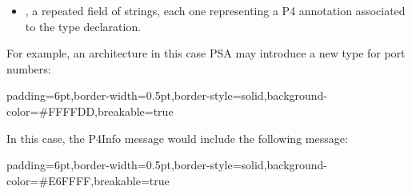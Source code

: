 \documentclass[11pt]{article}
\begin{document}
{\begin{itemize}
\item{}
, a repeated field of strings, each one representing a P4
annotation associated to the type declaration.%
\end{itemize}%

\noindent{}For example, an architecture \textemdash{} in this case PSA \textemdash{} may introduce a new type
for port numbers:%

\begin{mdbmargintb}{6pt}{6pt}%
\begin{mdblock}{padding=6pt,border-width=0.5pt,border-style=solid,background-color=\#FFFFDD,breakable=true}%
\begin{mdpre}%
\end{mdpre}%
\end{mdblock}%
\end{mdbmargintb}%

\noindent{}In this case, the P4Info message would include the following 
message:%

\begin{mdbmargintb}{6pt}{6pt}%
\begin{mdblock}{padding=6pt,border-width=0.5pt,border-style=solid,background-color=\#E6FFFF,breakable=true}%
\begin{mdpre}%
\end{mdpre}%
\end{mdblock}%
\end{mdbmargintb}%

}
\end{document}
